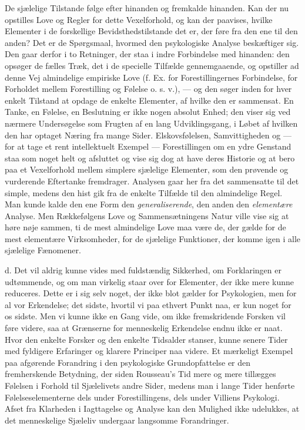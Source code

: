 \documentclass[12pt,a4paper,openany]{book}
\newcommand{\opage}[1]{\marginnote{\footnotesize\textit{[#1]}}}
\begin{document}
De sjælelige Tilstande følge efter hinanden og fremkalde hinanden. Kan
der nu opstilles Love og Regler for dette Vexelforhold, og kan der
paavises, hvilke Elementer i de forskellige Bevidsthedstilstande det er,
der føre fra den ene til den anden? Det er de Spørgsmaal, hvormed den
psykologiske Analyse beskæftiger sig. Den gaar derfor i to Retninger,
der staa i indre Forbindelse med hinanden: den opsøger de fælles Træk,
det i de specielle Tilfælde gennemgaaende, og opstiller ad denne Vej
almindelige empiriske Love (f. Ex. for Forestillingernes Forbindelse,
for Forholdet mellem Forestilling og Følelse o. s. v.), --- og den søger
inden for hver enkelt Tilstand at opdage de enkelte Elementer, af hvilke
den er sammensat. En Tanke, en Følelse, en Beslutning er ikke nogen
absolut Enhed; den viser sig ved nærmere Undersøgelse som Frugten af en
lang Udviklingsgang, i Løbet af hvilken den har optaget Næring fra mange
Sider. Elskovsfølelsen, Samvittigheden og --- for at tage et rent
intellektuelt Exempel --- Forestillingen om en ydre Genstand staa som
noget helt og afsluttet
\opage{24}og vise sig dog at have deres Historie og at bero paa et
Vexelforhold mellem simplere sjælelige Elementer, som den prøvende og
vurderende Eftertanke fremdrager. Analysen gaar her fra det sammensatte
til det simple, medens den hist gik fra de enkelte Tilfælde til den
almindelige Regel. Man kunde kalde den ene Form den
\emph{generaliserende}, den anden den \emph{elementære} Analyse. Men
Rækkefølgens Love og Sammensætningens Natur ville vise sig at høre nøje
sammen, ti de mest almindelige Love maa være de, der gælde for de mest
elementære Virksomheder, for de sjælelige Funktioner, der komme igen i
alle sjælelige Fænomener.

d. Det vil aldrig kunne vides med fuldstændig Sikkerhed, om Forklaringen
er udtømmende, og om man virkelig staar over for Elementer, der ikke
mere kunne reduceres. Dette er i sig selv noget, der ikke blot gælder
for Psykologien, men for al vor Erkendelse; det sidste, hvortil vi paa
ethvert Punkt naa, er kun noget for os sidste. Men vi kunne ikke en Gang
vide, om ikke fremskridende Forsken vil føre videre, saa at Grænserne
for menneskelig Erkendelse endnu ikke er naat. Hvor den enkelte Forsker
og den enkelte Tidsalder stanser, kunne senere Tider med fyldigere
Erfaringer og klarere Principer naa videre. Et mærkeligt Exempel paa
afgørende Forandring i den psykologiske Grundopfattelse er den
fremherskende Betydning, der siden Rousseau’s Tid mere og mere tillægges
Følelsen i Forhold til Sjælelivets andre Sider, medens man i lange Tider
henførte Følelseselementerne dels under Forestillingens, dels under
Villiens Psykologi. Afset fra Klarheden i Iagttagelse og Analyse kan den
Mulighed ikke udelukkes, at det menneskelige Sjæleliv undergaar
langsomme Forandringer.
\end{document}
